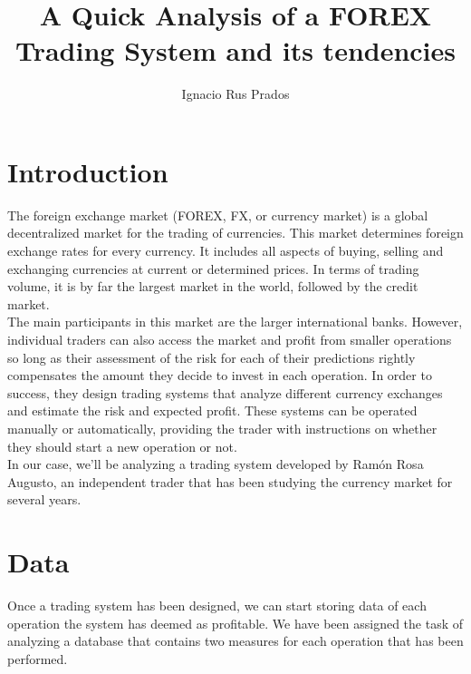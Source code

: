 \documentclass[sigconf, nonacm]{acmart}
\begin{document}
\title{A Quick Analysis of a FOREX Trading System and its tendencies}

\author{Ignacio Rus Prados}

\maketitle

\section{Introduction}

The foreign exchange market (FOREX, FX, or currency market) is a global decentralized market for the trading of currencies. This market determines foreign exchange rates for every currency. It includes all aspects of buying, selling and exchanging currencies at current or determined prices. In terms of trading volume, it is by far the largest market in the world, followed by the credit market. \\

The main participants in this market are the larger international banks. However, individual traders can also access the market and profit from smaller operations so long as their assessment of the risk for each of their predictions rightly compensates the amount they decide to invest in each operation. In order to success, they design trading systems that analyze different currency exchanges and estimate the risk and expected profit. These systems can be operated manually or automatically, providing the trader with instructions on whether they should start a new operation or not. \\

In our case, we'll be analyzing a trading system developed by Ramón Rosa Augusto, an independent trader that has been studying the currency market for several years.

\section{Data}

Once a trading system has been designed, we can start storing data of each operation the system has deemed as profitable. We have been assigned the task of analyzing a database that contains two measures for each operation that has been performed.\\
\end{document}
